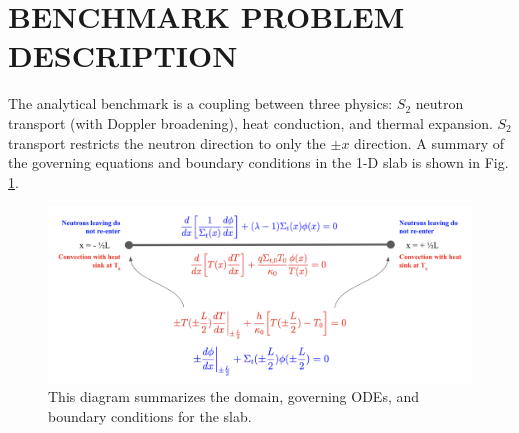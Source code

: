 \documentclass[letterpaper]{mc2023}
\begin{document}
\section{BENCHMARK PROBLEM DESCRIPTION}
\label{sec:benchmark}
The analytical benchmark is a coupling between three physics: $S_2$ neutron transport (with Doppler broadening), heat conduction,
and thermal expansion. $S_{2}$ transport restricts the neutron direction to only the $\pm x$ direction. A summary of the governing
equations and boundary conditions in the 1-D slab is shown in Fig. \ref{fig:slab_diagram}.
\begin{figure}[H]
    \centering
    \includegraphics[width=0.65\linewidth]{figures/1D_Benchmark_Diagram.png}
    \caption{This diagram summarizes the domain, governing ODEs, and boundary conditions for the slab.}
    \label{fig:slab_diagram}
\end{figure}
\end{document}
